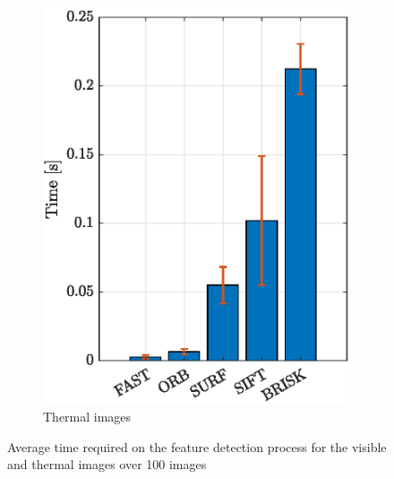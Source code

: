 \begin{figure}[!h]
\begin{subfigure}[b]{0.46\textwidth}
         \includegraphics[width=\textwidth]{Images/TIRDetectTime.eps}
         \caption{Thermal images}
         \label{fig:detecttir}
     \end{subfigure}
        \caption[Time required for the feature detection process]{Average time required on the feature detection process for the visible and thermal images over 100 images}
        \label{fig:ndetect}
\end{figure}


